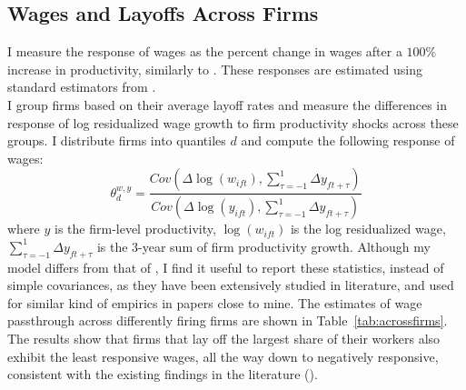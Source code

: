 \subsection*{Wages and Layoffs Across Firms}
I measure the response of wages as the percent change in wages after a $100\%$ increase in productivity, similarly to \textcite{souchier2022}. These responses are estimated using standard estimators from \textcite{guiso2005}. \\
I group firms based on their average layoff rates and measure the differences in response of log residualized wage growth to firm productivity shocks across these groups. I distribute firms into quantiles $d$ and compute the following response of wages:
\[\theta^{w,y}_d = \frac{Cov(\Delta \log(w_{ift}),\sum_{\tau=-1}^1 \Delta y_{ft+\tau})}{Cov(\Delta \log(y_{ift}),\sum_{\tau=-1}^1 \Delta y_{ft+\tau})}\]
where $y$ is the firm-level productivity, $\log(w_{ift})$ is the log residualized wage, $\sum_{\tau=-1}^1 \Delta y_{ft+\tau}$ is the 3-year sum of firm productivity growth. Although my model differs from that of \textcite{guiso2005}, I find it useful to report these statistics, instead of simple covariances, as they have been extensively studied in literature, and used for similar kind of empirics in papers close to mine.
The estimates of wage passthrough across differently firing firms are shown in Table~\ref{tab:acrossfirms}. The results show that firms that lay off the largest share of their workers also exhibit the least responsive wages, all the way down to negatively responsive, consistent with the existing findings in the literature (\textcite{enrlich2024}). 

